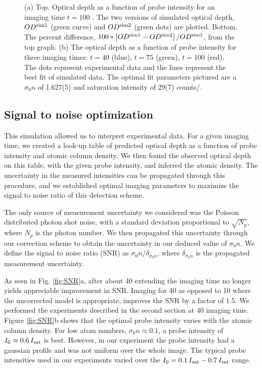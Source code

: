 \documentclass[12pt]{iopart}
\begin{document}
\begin{figure}
\caption{(a) Top. Optical depth as a function of probe intensity for an imaging time $t=100$ \us. The two versions of simulated optical depth, $OD^{\rm{sim1}}$ (green curve) and $OD^{\rm{sim2}}$ (green dots) are plotted. Bottom. The percent difference, $100*\left|OD^{\rm{sim1}}-OD^{\rm{sim2}}\right|/OD^{\rm{sim1}} $, from the top graph. (b) The optical depth as a function of probe intensity for three imaging times: $t=40$\us{} (blue),  $t=75$\us{} (green),  $t=100$\us{} (red). The dots represent experimental data and the lines represent the best fit of simulated data. The optimal fit parameters pictured are a $\sigma_0 n$ of 1.627(5) and saturation intensity of 29(7) counts/\us{}.  }  
\label{fig:compareModelsAndIsat}
\end{figure}

\subsection{Signal to noise optimization}
This simulation allowed us to interpret experimental data. For a given imaging time, we created a look-up table of predicted optical depth as a function of probe intensity and atomic column density. We then found the observed optical depth on this table, with the given probe intensity, and inferred the atomic density. The uncertainty in the measured intensities can be propagated through this procedure, and we established optimal imaging parameters to maximize the signal to noise ratio of this detection scheme. 
\par The only source of measurement uncertainty we considered was the Poisson distributed photon shot noise, with a standard deviation proportional to $\sqrt{N_p}$, where $N_p$ is the photon number. We then propagated this uncertainty through our correction scheme to obtain the uncertainty in our deduced value of $\sigma_0 n$. We define the signal to noise ratio (SNR) as $\sigma_0 n/\delta_{\sigma_0 n}$, where $ \delta_{\sigma_0 n}$ is the propagated measurement uncertainty.
\par As seen in Fig. \ref{fig:SNR}a, after about 40 \us{} extending the imaging time no longer yields appreciable improvement in SNR. Imaging for 40 \us{} as opposed to 10 \us{} where the uncorrected model is appropriate, improves the SNR by a factor of  1.5. We performed the experiments described in the second section at 40 \us{} imaging time. Figure \ref{fig:SNR}b shows that the optimal probe intensity varies with the atomic column density. For low atom numbers, $\sigma_0 n\approx0.1$, a probe intensity of $I_0\approx0.6\,I_{\rm{sat}}$ is best. However, in our experiment the probe intensity had a gaussian profile and was not uniform over the whole image.  The typical probe intensities used in our experiments varied over the $I_0=0.1\,I_{\rm{sat}}-0.7\,I_{\rm{sat}}$  range.
\end{document}

